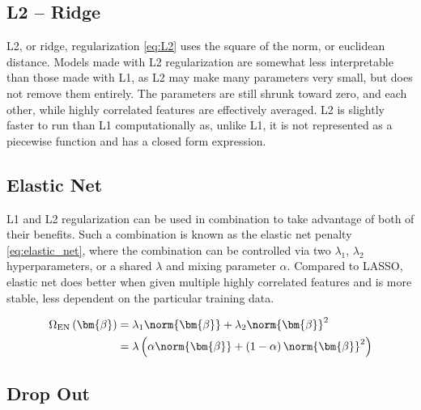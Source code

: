 \subsection{L2 -- Ridge}
\label{ml_general:reg:L2}

L2, or ridge, regularization \cref{eq:L2} uses the square of the norm, or euclidean distance.
Models made with L2 regularization are somewhat less interpretable than those made with L1,
as L2 may make many parameters very small, but does not remove them entirely.
The parameters are still shrunk toward zero, and each other,
while highly correlated features are effectively averaged.
L2 is slightly faster to run than L1 computationally as, unlike L1, it
is not represented as a piecewise function and has a closed form expression.

\subsection{Elastic Net}
\label{ml_general:reg:EN}

L1 and L2 regularization can be used in combination
to take advantage of both of their benefits.
Such a combination is known as the elastic net penalty \cref{eq:elastic_net},
where the combination can be controlled via two $\lambda_{1}$, $\lambda_{2}$ hyperparameters,
or a shared $\lambda$ and mixing parameter $\alpha$.
Compared to LASSO, elastic net does better when given multiple highly correlated features
and is more stable, \ie less dependent on the particular training data.

\begin{equation} \label{eq:elastic_net}
\begin{split}
\Omega_{\text{EN}}\left(\bm{\beta}\right) &= \lambda_{1} \norm{\bm{\beta}} + \lambda_{2} \norm{\bm{\beta}}^{2}\\
&= \lambda \left( \alpha\norm{\bm{\beta}} + \left(1-\alpha\right)\norm{\bm{\beta}}^{2} \right)
\end{split}
\end{equation}


\subsection{Drop Out}
\label{ml_general:reg:Drop}

